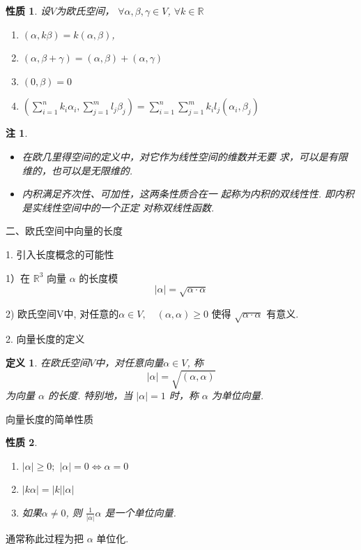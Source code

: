 \documentclass[13pt]{beamer}
\newtheorem*{defi}{定义}
\newtheorem*{rem}{注}
\newtheorem*{prop}{性质}
\def\R{\mathbb{R}}
\begin{document}
\begin{frame}
\begin{prop}
设$V$为欧氏空间， 
$\forall \alpha, \beta, \gamma \in {V}$, $\forall k \in \mathbb{R}$
\begin{enumerate}
	\item  $(\alpha, k \beta)=k(\alpha, \beta)$, 
	\item $(\alpha, \beta+\gamma)=(\alpha, \beta)+(\alpha, \gamma)$
	\item   $({0}, \beta)=0$
	\item $\left(\sum_{i=1}^{n} k_{i} \alpha_{i}, \sum_{j=1}^{m} l_{j} \beta_{j}\right)=\sum_{i=1}^{n} \sum_{j=1}^{m} k_{i} l_{j}\left(\alpha_{i}, \beta_{j}\right)$
\end{enumerate}
\end{prop}


\begin{rem}
\begin{itemize}
\item 在欧几里得空间的定义中，对它作为线性空间的维数并无要 求，可以是有限维的，也可以是无限维的. 
\item 内积满足齐次性、可加性，这两条性质合在一
起称为内积的双线性性. 即内积是实线性空间中的一个正定
对称双线性函数. 
\end{itemize}
\end{rem}
\end{frame}
 
 
 \begin{frame}{ 二、欧氏空间中向量的长度}
 
 1. 引入长度概念的可能性
 
 1）在 ${\R}^{3}$ 向量 $\alpha$ 的长度模 $$|\alpha|=\sqrt{\alpha \cdot \alpha}$$
 
 2) 欧氏空间V中,  对任意的$ \alpha \in V, \quad(\alpha, \alpha) \geq {0}$ 使得 $\sqrt{\alpha \cdot \alpha}$ 有意义.
 
 2. 向量长度的定义

\begin{defi}
 在欧氏空间$V$中，对任意向量$\alpha \in V$,
称 $$|\alpha|=\sqrt{(\alpha, \alpha)}$$ 为向量 $\alpha$ 的\alert{长度}.
特别地，当 $|\alpha |=1$ 时，称 $\alpha$ 为\alert{单位向量}.
\end{defi}

 \end{frame}


\begin{frame}{向量长度的简单性质}
\begin{prop}
\begin{enumerate}
	\item $|\alpha| \geq {0}; $  \qquad $|\alpha|={0} \Leftrightarrow \alpha={0}$
	
	\item  $|k \alpha|=|k||\alpha|$
	
	\item 如果$\alpha \neq 0$,  则 $\frac{1}{|\alpha|} \alpha$ 是一个\alert{单位向量}. 
\end{enumerate}
\end{prop}



通常称此过程为把 $\alpha$ \alert{单位化}.
\end{frame}
\end{document}
